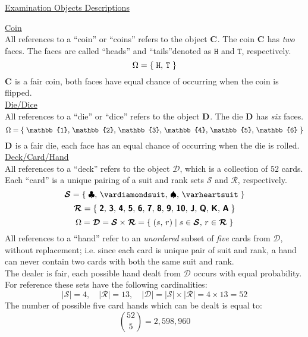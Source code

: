 \documentclass{ExamCUNY}
\newcommand{\Coin}[1]{\ensuremath{\mathbf{C}_{#1}}\xspace}
\newcommand{\Heads}{\ensuremath{\mathtt{H}}\xspace}
\newcommand{\Tails}{\ensuremath{\mathtt{T}}\xspace}
\newcommand{\Die}[1]{\ensuremath{\mathbf{D}_{#1}}\xspace}
\newcommand{\Num}[1]{\ensuremath{\mathbb{#1}}\xspace}
\newcommand{\Deck}{\ensuremath{\bm{\mathcal{D}}}\xspace}
\newcommand{\CardSuits}{\ensuremath{\bm{\mathcal{S}}}\xspace}
\newcommand{\CardRanks}{\ensuremath{\bm{\mathcal{R}}}\xspace}
\newcommand{\CardRank}[1]{\ensuremath{\text{\textsf{\textbf{#1}}}}\xspace}
\begin{document}
\newcommand{\ExamObject}[2]{%
{\huge \underline{#1}}\\[5mm]%
{\Large #2}\\[5mm]%
}


\clearpage%
%  
\begin{center}
{\Huge \underline{Examination Objects Descriptions}}
\end{center}

\ExamObject{Coin}{%
All references to a ``coin'' or ``coins'' refers to the object \Coin{}. The coin \Coin{} has \emph{two} faces.
The faces are called ``heads'' and ``tails''denoted as \Heads and \Tails, respectively.
\[\Omega = \SetNote{\Heads,\,\Tails}\]
\Coin{} is a fair coin, both faces have equal chance of occurring when the coin is flipped.
}

\ExamObject{Die/Dice}{%
All references to a ``die'' or ``dice'' refers to the object \Die{}. The die \Die{} has \emph{six} faces.
\[\Omega = \SetNote{\Num{1},\,\Num{2},\,\Num{3},\,\Num{4},\,\Num{5},\,\Num{6}}\]
\Die{} is a fair die, each face has an equal chance of occurring when the die is rolled.}


\ExamObject{Deck/Card/Hand}{
All references to a ``deck'' refers to the object \Deck, which is a collection of $52$ cards.
Each ``card'' is a unique pairing of a suit and rank sets \CardSuits and \CardRanks, respectively.
\[\CardSuits = 
\SetNote{
\clubsuit,\,
\vardiamondsuit,\,
\spadesuit,\, 
\varheartsuit
}\]
\[\CardRanks = \SetNote{
\CardRank{2},\,
\CardRank{3},\,
\CardRank{4},\,
\CardRank{5},\,
\CardRank{6},\,
\CardRank{7},\,
\CardRank{8},\,
\CardRank{9},\,
\CardRank{10},\,
\CardRank{J},\,
\CardRank{Q},\,
\CardRank{K},\,
\CardRank{A}
}\]
\[\Omega = \Deck = \CardSuits \times \CardRanks = \SetNote{ (s,\,r)\;|\; s \in \CardSuits,\, r \in \CardRanks}\]
All references to a ``hand'' refer to an \emph{unordered} subset of \emph{five} cards from \Deck, without replacement; i.e. since each card is unique pair of suit and rank, a hand can never contain two cards with both the same suit and rank.\\[3mm]
The dealer is fair, each possible hand dealt from \Deck occurs with equal probability.\\[3mm]
For reference these sets have the following cardinalities:
\[ \left|\CardSuits\right| = 4,\quad\left|\CardRanks\right| = 13,\quad\left|\Deck\right| = \left|\CardSuits\right| \times \left|\CardRanks\right| = 4 \times 13 = 52 \]
The number of possible five card hands which can be dealt is equal to:
\[ \binom{52}{5} = 2,598,960 \]
}
\end{document}
